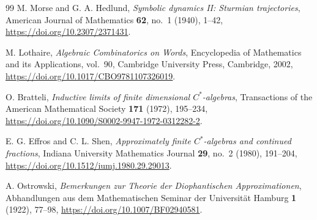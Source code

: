 \documentclass{book}
\begin{document}
\begin{thebibliography}{99}
  M. Morse and G. A. Hedlund,
  \textit{Symbolic dynamics II: Sturmian trajectories},
  American Journal of Mathematics
  \textbf{62}, no.~1 (1940), 1--42,
  \url{https://doi.org/10.2307/2371431}.

  M. Lothaire,
  \textit{Algebraic Combinatorics on Words},
  Encyclopedia of Mathematics and its Applications, vol.~90,
  Cambridge University Press,
  Cambridge,
  2002,
  \url{https://doi.org/10.1017/CBO9781107326019}.

  O. Bratteli,
  \textit{Inductive limits of finite dimensional \(C^*\)-algebras},
  Transactions of the American Mathematical Society
  \textbf{171} (1972), 195--234,
  \url{https://doi.org/10.1090/S0002-9947-1972-0312282-2}.

  E. G. Effros and C. L. Shen,
  \textit{Approximately finite \(C^*\)-algebras and continued fractions},
  Indiana University Mathematics Journal
  \textbf{29}, no.~2 (1980), 191--204,
  \url{https://doi.org/10.1512/iumj.1980.29.29013}.

  A. Ostrowski,
  \textit{Bemerkungen zur Theorie der Diophantischen Approximationen},
  Abhandlungen aus dem Mathematischen Seminar der Universit\"at Hamburg
  \textbf{1} (1922), 77--98,
  \url{https://doi.org/10.1007/BF02940581}.

\end{thebibliography}
\end{document}
